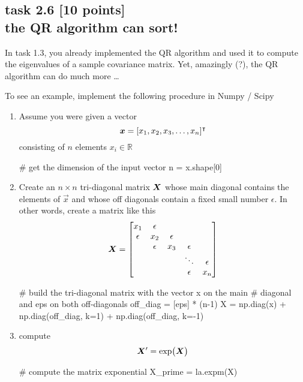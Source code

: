 
\subsection*{task 2.6 [10 points] \\[1ex] the QR algorithm can sort!}

In task 1.3, you already implemented the QR algorithm and used it to compute the eigenvalues of a sample covariance matrix. Yet, amazingly (?), the QR algorithm can do much more \ldots

To see an example, implement the following procedure in Numpy / Scipy


\begin{enumerate}
\item Assume you were given a vector
\begin{equation*}
\bm{x} = [x_1, x_2, x_3, \ldots, x_n]^\intercal
\end{equation*}
consisting of $n$ elements $x_i \in \mathbb{R}$
\begin{python}
# get the dimension of the input vector
n = x.shape[0]
\end{python}

\item Create an $n \times n$ tri-diagonal matrix $\bm{X}$ whose main diagonal contains the elements of $\vec{x}$ and whose off diagonals contain a fixed small number $\epsilon$. In other words, create a matrix like this
\begin{equation*}
\bm{X} = 
\begin{bmatrix}
     x_1 & \epsilon \\
\epsilon &      x_2 & \epsilon \\
         & \epsilon &      x_3 & \epsilon \\
         &          &          &   \ddots & \epsilon \\ 
         &          &          & \epsilon &      x_n
\end{bmatrix}
\end{equation*}
\begin{python}
# build the tri-diagonal matrix with the vector x on the main
# diagonal and eps on both off-diagonals
off_diag = [eps] * (n-1)
X = np.diag(x) + np.diag(off_diag, k=1) + np.diag(off_diag, k=-1)
\end{python}

\item compute 
\begin{equation*}
\bm{X}' = \exp \bigl( \bm{X} \bigr)
\end{equation*}
\begin{python}
# compute the matrix exponential
X_prime = la.expm(X)
\end{python}


\end{enumerate}
